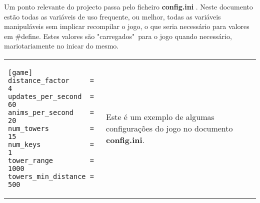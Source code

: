 

Um ponto relevante do projecto passa pelo ficheiro {\bf config.ini} . Neste documento estão todas as variáveis de uso frequente, ou melhor, todas as variáveis manipuláveis sem implicar recompilar o jogo, o que seria necessário para valores em \#define. Estes valores são "carregados"\ para o jogo quando necessário, mariotariamente no inicar do mesmo.

\-
\begin{center}
\begin{tabular} {l | p{10cm}}
\begin{lstlisting}
[game]
distance_factor		= 4
updates_per_second	= 60
anims_per_second	= 20
num_towers			= 15
num_keys			= 1
tower_range			= 1000
towers_min_distance = 500
\end{lstlisting} 
& 
Este é um exemplo de algumas configurações do jogo no documento {\bf config.ini}. \\
\end{tabular}
\end{center}
